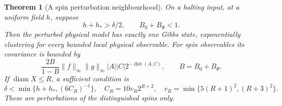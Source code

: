 \documentclass[11pt,reqno]{amsart}
\numberwithin{equation}{section}
\newtheorem{theorem}{Theorem}[section]
\theoremstyle{definition}
\theoremstyle{remark}
\newcommand{\diam}{\operatorname{diam}}
\newcommand{\dist}{\operatorname{dist}}
\newcommand{\norm}[1]{\lVert#1\rVert}
\begin{document}
\begin{theorem}[A spin perturbation neighbourhood]\label{thm:spinpert}
On a halting input, at a uniform field $h$, suppose
\begin{equation}\label{eq:pertconditions}
 h+h_*>\delta/2,\qquad B_0+B_\Psi<1.
\end{equation}
Then the perturbed physical model has exactly one Gibbs state, exponentially clustering for every bounded local physical observable. For spin observables its covariance is bounded by
\[
 \frac{2B}{1-B}\norm f_\infty\norm g_\infty|A||C|2^{-\dist(A,C)},
 \qquad B=B_0+B_\Psi.
\]
If $\diam X\leq R$, a sufficient condition is
\begin{equation}\label{eq:explicitradius}
 \delta<\min\{h+h_*,(6C_R)^{-1}\},\quad
 C_R=10v_R2^{R+2},\quad v_R=\min\{5(R+1)^2,(R+3)^2\}.
\end{equation}
These are perturbations of the distinguished spins only.
\end{theorem}
\end{document}
